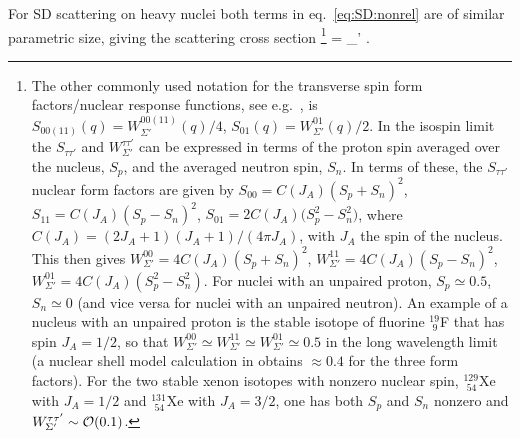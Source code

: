 For SD scattering on heavy nuclei both terms in eq.~\eqref{eq:SD:nonrel} are of similar parametric size, giving the scattering cross section \cite{Anand:2013yka}\footnote{The other commonly used notation for the transverse spin form factors/nuclear response functions, 
see  e.g.~\cite{0803.2360,Bednyakov:2006ux}, is $S_{00(11)}(q)= W_{\Sigma'}^{00(11)}(q)/4$, $S_{01}(q)= W_{\Sigma'}^{01}(q)/2$. In the isospin limit the $S_{\tau\tau'}$ and $W_{\Sigma'}^{\tau\tau'}$ can be expressed in terms of the proton spin averaged over the  nucleus, $S_p$, and the averaged neutron spin, $S_n$. In terms of these, the $S_{\tau\tau'}$ nuclear form factors are given by $S_{00}=C(J_A) (S_p+S_n)^2$, $S_{11}=C(J_A)(S_p-S_n)^2$, $S_{01}=2 C(J_A) \big(S_p^2-S_n^2\big)$, where $C(J_A)=(2J_A+1)(J_A+1)/(4\pi J_A)$, with $J_A$ the spin of the nucleus. This then gives $W_{\Sigma'}^{00}=4  C(J_A) (S_p+S_n)^2$,   $W_{\Sigma'}^{11}=4 C(J_A) (S_p-S_n)^2$, $W_{\Sigma'}^{01}=4 C(J_A) (S_p^2-S_n^2)$. For nuclei with an unpaired proton, $S_p\simeq 0.5$, $S_n\simeq 0$ (and vice versa for nuclei with an unpaired neutron). An example of a nucleus with an unpaired proton is the stable isotope of fluorine ${}^{19}_{\,\,9}$F that has spin $J_A=1/2$,  
 so that $W_{\Sigma'}^{00}\simeq  W_{\Sigma'}^{11} \simeq W_{\Sigma'}^{01}\simeq 0.5$ in the long wavelength limit (a nuclear shell model calculation in \cite{Anand:2013yka} obtains $\approx 0.4$ for the three form factors). For the two stable xenon isotopes with nonzero nuclear spin, ${}^{129}_{\,\,54}$Xe with $J_A=1/2$ and ${}^{131}_{\,\,54}$Xe with $J_A=3/2$, one has both $S_p$ and $S_n$ nonzero and $W_{\rm \Sigma'}^{\tau\tau'}\sim {\mathcal O}(0.1)$.   }
\beq 
\label{eq:dsigmaAdER:SD}
 =  \sum_{\tau\tau'} .
\eeq
